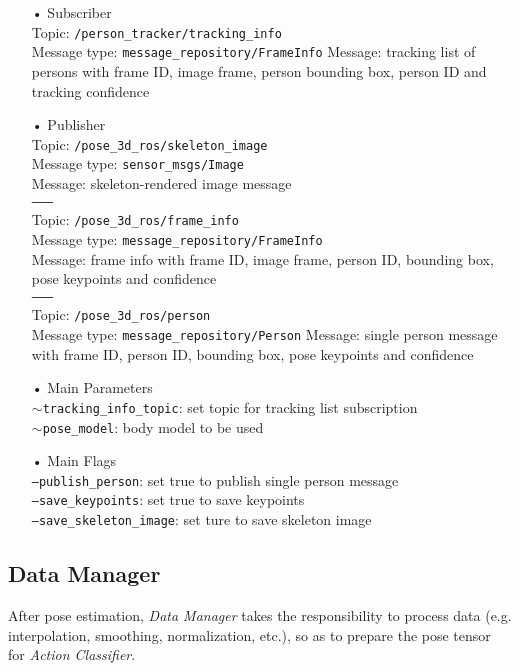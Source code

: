 \begin{itemize}
\item[•] Subscriber \\
Topic: \texttt{/person\_tracker/tracking\_info} \\
Message type: \texttt{message\_repository/FrameInfo}
Message: tracking list of persons with frame ID, image frame, person bounding box, person ID and tracking confidence

\item[•] Publisher \\
Topic: \texttt{/pose\_3d\_ros/skeleton\_image} \\
Message type: \texttt{sensor\_msgs/Image} \\
Message: skeleton-rendered image message \\
\texttt{--------} \\
Topic: \texttt{/pose\_3d\_ros/frame\_info} \\
Message type: \texttt{message\_repository/FrameInfo} \\
Message: frame info with frame ID, image frame, person ID, bounding box, pose keypoints and confidence \\
\texttt{--------} \\
Topic: \texttt{/pose\_3d\_ros/person} \\
Message type: \texttt{message\_repository/Person}
Message: single person message with frame ID, person ID, bounding box, pose keypoints and confidence

\item[•] Main Parameters \\
\texttt{$\sim$tracking\_info\_topic}: set topic for tracking list subscription \\
\texttt{$\sim$pose\_model}: body model to be used

\item[•] Main Flags \\
\texttt{---publish\_person}: set true to publish single person message \\
\texttt{---save\_keypoints}: set true to save keypoints \\
\texttt{---save\_skeleton\_image}: set ture to save skeleton image
\end{itemize}

\subsection{Data Manager}
\label{pipeline:DM}
After pose estimation, \textit{Data Manager} takes the responsibility to process data (e.g. interpolation, smoothing, normalization, etc.), so as to prepare the pose tensor for \textit{Action Classifier}. 

